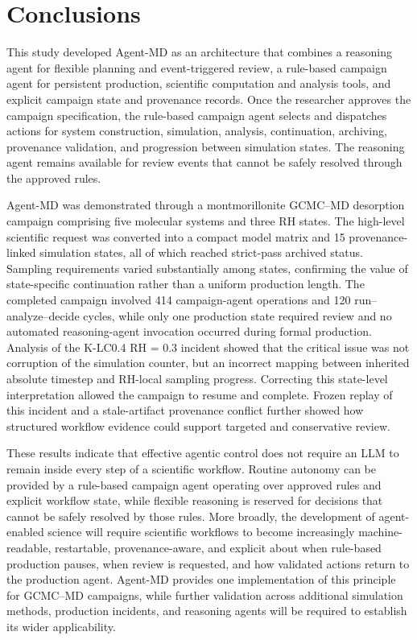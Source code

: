 \section{Conclusions}

This study developed Agent-MD as an architecture that combines a reasoning agent for flexible planning and event-triggered review, a rule-based campaign agent for persistent production, scientific computation and analysis tools, and explicit campaign state and provenance records. Once the researcher approves the campaign specification, the rule-based campaign agent selects and dispatches actions for system construction, simulation, analysis, continuation, archiving, provenance validation, and progression between simulation states. The reasoning agent remains available for review events that cannot be safely resolved through the approved rules.

Agent-MD was demonstrated through a montmorillonite GCMC--MD desorption campaign comprising five molecular systems and three RH states. The high-level scientific request was converted into a compact model matrix and 15 provenance-linked simulation states, all of which reached strict-pass archived status. Sampling requirements varied substantially among states, confirming the value of state-specific continuation rather than a uniform production length. The completed campaign involved 414 campaign-agent operations and 120 run--analyze--decide cycles, while only one production state required review and no automated reasoning-agent invocation occurred during formal production. Analysis of the K-LC0.4 RH = 0.3 incident showed that the critical issue was not corruption of the simulation counter, but an incorrect mapping between inherited absolute timestep and RH-local sampling progress. Correcting this state-level interpretation allowed the campaign to resume and complete. Frozen replay of this incident and a stale-artifact provenance conflict further showed how structured workflow evidence could support targeted and conservative review.

These results indicate that effective agentic control does not require an LLM to remain inside every step of a scientific workflow. Routine autonomy can be provided by a rule-based campaign agent operating over approved rules and explicit workflow state, while flexible reasoning is reserved for decisions that cannot be safely resolved by those rules. More broadly, the development of agent-enabled science will require scientific workflows to become increasingly machine-readable, restartable, provenance-aware, and explicit about when rule-based production pauses, when review is requested, and how validated actions return to the production agent. Agent-MD provides one implementation of this principle for GCMC--MD campaigns, while further validation across additional simulation methods, production incidents, and reasoning agents will be required to establish its wider applicability.

